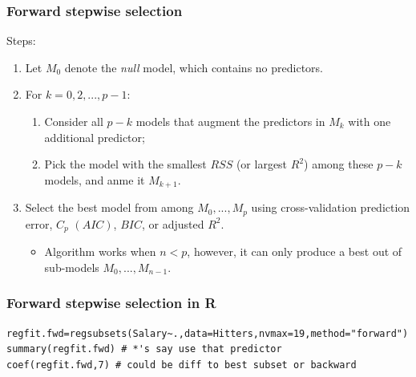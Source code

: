 \documentclass[11pt]{article}
\begin{document}
\subsubsection{Forward stepwise selection}
\noindent Steps:
\begin{enumerate}
    \item Let $M_0$ denote the \textit{null} model, which contains no predictors.
    \item For $k=0,2,...,p-1$:
        \begin{enumerate}
            \item Consider all $p-k$ models that augment the predictors in $M_k$ with one additional predictor;
            \item Pick the model with the smallest $RSS$ (or largest $R^2$) among these $p-k$ models, and anme it $M_{k+1}$.
        \end{enumerate}
    \item Select the best model from among $M_0,...,M_p$ using cross-validation prediction error, $C_p$ $(AIC)$, $BIC$, or adjusted $R^2$. 
        \begin{itemize}
            \item Algorithm works when $n < p$, however, it can only produce a best out of sub-models $M_0, ..., M_{n-1}$.
        \end{itemize}
\end{enumerate}

\subsubsection{Forward stepwise selection in R}
\begin{lstlisting}
regfit.fwd=regsubsets(Salary~.,data=Hitters,nvmax=19,method="forward")
summary(regfit.fwd) # *'s say use that predictor
coef(regfit.fwd,7) # could be diff to best subset or backward
\end{lstlisting}
\end{document}
